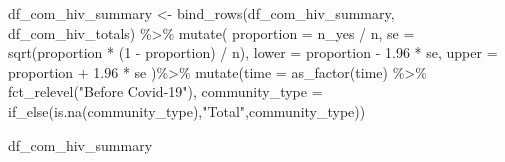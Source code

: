 \documentclass[
  letterpaper,
  DIV=11,
  numbers=noendperiod]{scrartcl}
\newenvironment{Shaded}{\begin{snugshade}}{\end{snugshade}}
\newcommand{\AttributeTok}[1]{\textcolor[rgb]{0.40,0.45,0.13}{#1}}
\newcommand{\DecValTok}[1]{\textcolor[rgb]{0.68,0.00,0.00}{#1}}
\newcommand{\FloatTok}[1]{\textcolor[rgb]{0.68,0.00,0.00}{#1}}
\newcommand{\FunctionTok}[1]{\textcolor[rgb]{0.28,0.35,0.67}{#1}}
\newcommand{\NormalTok}[1]{\textcolor[rgb]{0.00,0.23,0.31}{#1}}
\newcommand{\OtherTok}[1]{\textcolor[rgb]{0.00,0.23,0.31}{#1}}
\newcommand{\SpecialCharTok}[1]{\textcolor[rgb]{0.37,0.37,0.37}{#1}}
\newcommand{\StringTok}[1]{\textcolor[rgb]{0.13,0.47,0.30}{#1}}
\begin{document}
\begin{Shaded}
\begin{Highlighting}[]
\NormalTok{df\_com\_hiv\_summary }\OtherTok{\textless{}{-}} \FunctionTok{bind\_rows}\NormalTok{(df\_com\_hiv\_summary, df\_com\_hiv\_totals) }\SpecialCharTok{\%\textgreater{}\%}
  \FunctionTok{mutate}\NormalTok{(}
    \AttributeTok{proportion =}\NormalTok{ n\_yes }\SpecialCharTok{/}\NormalTok{ n,}
    \AttributeTok{se =} \FunctionTok{sqrt}\NormalTok{(proportion }\SpecialCharTok{*}\NormalTok{ (}\DecValTok{1} \SpecialCharTok{{-}}\NormalTok{ proportion) }\SpecialCharTok{/}\NormalTok{ n),}
    \AttributeTok{lower =}\NormalTok{ proportion }\SpecialCharTok{{-}} \FloatTok{1.96} \SpecialCharTok{*}\NormalTok{ se,}
    \AttributeTok{upper =}\NormalTok{ proportion }\SpecialCharTok{+} \FloatTok{1.96} \SpecialCharTok{*}\NormalTok{ se}
\NormalTok{  )}\SpecialCharTok{\%\textgreater{}\%} 
  \FunctionTok{mutate}\NormalTok{(}\AttributeTok{time =} \FunctionTok{as\_factor}\NormalTok{(time) }\SpecialCharTok{\%\textgreater{}\%} 
           \FunctionTok{fct\_relevel}\NormalTok{(}\StringTok{"Before Covid{-}19"}\NormalTok{),}
         \AttributeTok{community\_type =} \FunctionTok{if\_else}\NormalTok{(}\FunctionTok{is.na}\NormalTok{(community\_type),}\StringTok{"Total"}\NormalTok{,community\_type))}



\NormalTok{df\_com\_hiv\_summary}
\end{Highlighting}
\end{Shaded}
\end{document}
